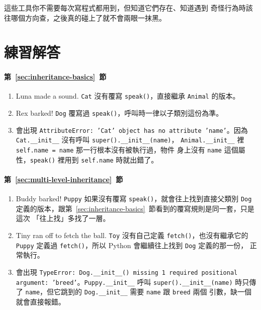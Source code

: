 這些工具你不需要每次寫程式都用到，但知道它們存在、知道遇到
奇怪行為時該往哪個方向查，之後真的碰上了就不會兩眼一抹黑。

\section*{練習解答}

\paragraph{第~\ref{sec:inheritance-basics}~節}
\begin{enumerate}
\item Luna made a sound. \texttt{Cat} 沒有覆寫 \texttt{speak()}，直接繼承
\texttt{Animal} 的版本。
\item Rex barked! \texttt{Dog} 覆寫過 \texttt{speak()}，呼叫時一律以子類別這份為準。
\item 會出現 \texttt{AttributeError: 'Cat' object has no attribute 'name'}。因為
\texttt{Cat.\_\_init\_\_} 沒有呼叫 \texttt{super().\_\_init\_\_(name)}，
\texttt{Animal.\_\_init\_\_} 裡 \texttt{self.name = name} 那一行根本沒有被執行過，物件
身上沒有 \texttt{name} 這個屬性，\texttt{speak()} 裡用到 \texttt{self.name} 時就出錯了。
\end{enumerate}

\paragraph{第~\ref{sec:multi-level-inheritance}~節}
\begin{enumerate}
\item Buddy barked! \texttt{Puppy} 如果沒有覆寫 \texttt{speak()}，就會往上找到直接父類別
\texttt{Dog} 定義的版本，跟第~\ref{sec:inheritance-basics}~節看到的覆寫規則是同一套，只是這次
「往上找」多找了一層。
\item Tiny ran off to fetch the ball. \texttt{Toy} 沒有自己定義 \texttt{fetch()}，也沒有繼承它的
\texttt{Puppy} 定義過 \texttt{fetch()}，所以 Python 會繼續往上找到 \texttt{Dog} 定義的那一份，
正常執行。
\item 會出現 \texttt{TypeError: Dog.\_\_init\_\_() missing 1 required positional argument:
'breed'}。\texttt{Puppy.\_\_init\_\_} 呼叫 \texttt{super().\_\_init\_\_(name)} 時只傳了
\texttt{name}，但它跳到的 \texttt{Dog.\_\_init\_\_} 需要 \texttt{name} 跟 \texttt{breed} 兩個
引數，缺一個就會直接報錯。
\end{enumerate}


